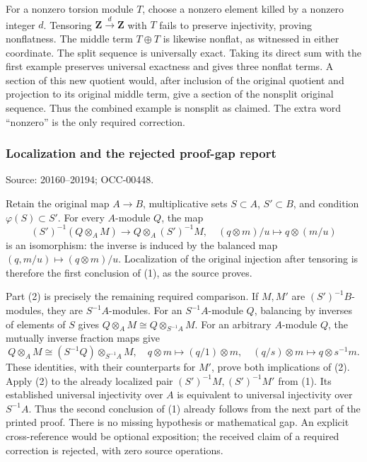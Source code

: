 For a nonzero torsion module \(T\), choose a nonzero element killed by a nonzero integer \(d\). Tensoring \(\mathbf Z\xrightarrow{d}\mathbf Z\) with \(T\) fails to preserve injectivity, proving nonflatness. The middle term \(T\oplus T\) is likewise nonflat, as witnessed in either coordinate. The split sequence is universally exact. Taking its direct sum with the first example preserves universal exactness and gives three nonflat terms. A section of this new quotient would, after inclusion of the original quotient and projection to its original middle term, give a section of the nonsplit original sequence. Thus the combined example is nonsplit as claimed. The extra word ``nonzero'' is the only required correction.

\subsubsection{Localization and the rejected proof-gap report}\label{algebra-proof-010-localization-and-the-rejected-proof-gap-report}

Source: 20160--20194; OCC-00448.

Retain the original map \(A\to B\), multiplicative sets \(S\subset A\), \(S'\subset B\), and condition \(\varphi(S)\subset S'\). For every \(A\)-module \(Q\), the map \[
(S')^{-1}(Q\otimes_AM)\longrightarrow Q\otimes_A(S')^{-1}M,
\quad (q\otimes m)/u\longmapsto q\otimes(m/u)
\] is an isomorphism: the inverse is induced by the balanced map \((q,m/u)\mapsto(q\otimes m)/u\). Localization of the original injection after tensoring is therefore the first conclusion of (1), as the source proves.

Part (2) is precisely the remaining required comparison. If \(M,M'\) are \((S')^{-1}B\)-modules, they are \(S^{-1}A\)-modules. For an \(S^{-1}A\)-module \(Q\), balancing by inverses of elements of \(S\) gives \(Q\otimes_AM\cong Q\otimes_{S^{-1}A}M\). For an arbitrary \(A\)-module \(Q\), the mutually inverse fraction maps give \[
Q\otimes_AM\cong(S^{-1}Q)\otimes_{S^{-1}A}M,
\quad q\otimes m\mapsto(q/1)\otimes m,
\quad(q/s)\otimes m\mapsto q\otimes s^{-1}m.
\] These identities, with their counterparts for \(M'\), prove both implications of (2). Apply (2) to the already localized pair \((S')^{-1}M,(S')^{-1}M'\) from (1). Its established universal injectivity over \(A\) is equivalent to universal injectivity over \(S^{-1}A\). Thus the second conclusion of (1) already follows from the next part of the printed proof. There is no missing hypothesis or mathematical gap. An explicit cross-reference would be optional exposition; the received claim of a required correction is rejected, with zero source operations.

